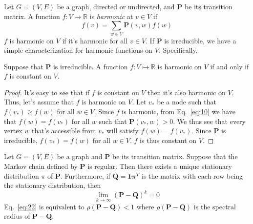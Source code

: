 Let $G = (V,E)$ be a graph, directed or undirected, and $\mathbf{P}$
be its transition matrix. A function $f \colon V \mapsto \mathbb{R}$
is {\em harmonic} at $v \in V$ if
\begin{equation}
  \label{eq:10}
  f(v) = \sum_{w \in V}{\mathbf{P}(v,w) f(w)}
\end{equation}
$f$ is harmonic on $V$ if it's harmonic for all $v \in V$. If $\mathbf{P}$
is irreducible, we have a simple characterization for harmonic
functions on $V$. Specifically,
\begin{lemma}
  \label{lem:1}
  Suppose that $\mathbf{P}$ is irreducible. A function $f \colon V \mapsto
  \mathbb{R}$ is harmonic on $V$ if and only if $f$ is constant on
  $V$. 
\end{lemma}
\begin{proof}
  It's easy to see that if $f$ is constant on $V$ then it's also
  harmonic on $V$. Thus, let's assume that $f$ is harmonic on $V$.
  Let $v_*$ be a node such that $f(v_*) \geq f(w)$ for all $w \in
  V$. Since $f$ is harmonic, from Eq.~\eqref{eq:10} we have that $f(w)
  = f(v_*)$ for all $w$ such that $\mathbf{P}(v_*,w) > 0$. We thus see
  that every vertex $w$ that's accessible from $v_*$ will satisfy
  $f(w) = f(v_*)$. Since $\mathbf{P}$ is irreducible, $f(v_*) = f(w)$ for
  all $w \in V$. $f$ is thus constant on $V$.
\end{proof}

\begin{proposition}
  \label{prop:6}
  Let $G = (V,E)$ be a graph and $\mathbf{P}$ be its transition
  matrix. Suppose that the Markov chain defined by $\mathbf{P}$ is
  regular. Then there exists a unique stationary distribution $\pi$ of
  $\mathbf{P}$. Furthermore, if $\mathbf{Q} = \mathbf{1} \mathbf{\pi}^{T}$ is the
  matrix with each row being the stationary distribution, then
  \begin{equation}
    \label{eq:22}
    \lim_{k \rightarrow \infty}(\mathbf{P} - \mathbf{Q})^{k} = 0 
  \end{equation}
  Eq.~\eqref{eq:22} is equivalent to $\rho(\mathbf{P}-\mathbf{Q}) < 1$
  where $\rho(\mathbf{P}-\mathbf{Q})$ is the spectral radius of
  $\mathbf{P} - \mathbf{Q}$.
\end{proposition}

